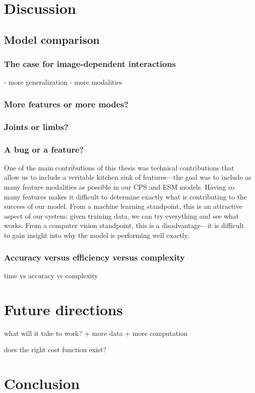 \chapter{Discussion}\label{sec:discussion}

\section{Model comparison}


\subsection{The case for image-dependent interactions}
- more generalization
- more modalities

\subsection{More features or more modes?}


\subsection{Joints or limbs?}

\subsection{A bug or a feature?}
One of the main contributions of this thesis was technical contributions that 
allow us to include a veritable kitchen sink of features---the goal was to 
include as many feature modalities as possible in our CPS and ESM models.  
Having so many features makes it difficult to determine exactly what is 
contributing to the success of our model.  From a machine learning standpoint, 
this is an attractive aspect of our system: given training data, we can try 
everything and see what works.  From a computer vision standpoint, this is a 
disadvantage---it is difficult to gain insight into why the model is performing 
well exactly.


\subsection{Accuracy versus efficiency versus complexity}
time vs accuracy vs complexity

\chapter{Future directions}

what will it take to work?
  + more data
  + more computation

does the right cost function exist?

\chapter{Conclusion}
